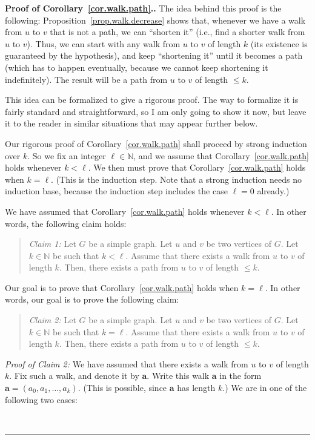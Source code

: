 \documentclass[numbers=enddot,12pt,final,onecolumn,notitlepage]{scrartcl}%
\theoremstyle{definition}
\newenvironment{statement}{\begin{quote}}{\end{quote}}
\newenvironment{proof}[1][Proof]{\noindent\textbf{#1.} }{\ \rule{0.5em}{0.5em}}
\newcommand{\NN}{\mathbb{N}}
\newcommand{\tup}[1]{\left( #1 \right)}
\begin{document}
\begin{proof}[Proof of Corollary~\ref{cor.walk.path}.]
The idea behind this proof is the following:
Proposition~\ref{prop.walk.decrease} shows that, whenever we have a
walk from $u$ to $v$ that is not a path, we can ``shorten it'' (i.e.,
find a shorter walk from $u$ to $v$).
Thus, we can start with any walk from $u$ to $v$ of length $k$ (its
existence is guaranteed by the hypothesis), and keep ``shortening it''
until it becomes a path (which has to happen eventually, because we
cannot keep shortening it indefinitely). The result will be a path
from $u$ to $v$ of length $\leq k$.

This idea can be formalized to give a rigorous proof. The way to
formalize it is fairly standard and straightforward, so I am only
going to show it now, but leave it to the reader in similar situations
that may appear further below.

Our rigorous proof of Corollary~\ref{cor.walk.path} shall proceed by
strong induction over $k$. So we fix an integer $\ell \in \NN$, and
we assume that Corollary~\ref{cor.walk.path} holds whenever
$k < \ell$. We then must prove that Corollary~\ref{cor.walk.path}
holds when $k = \ell$. (This is the induction step. Note that a strong
induction needs no induction base, because the induction step includes
the case $\ell = 0$ already.)

We have assumed that Corollary~\ref{cor.walk.path} holds whenever
$k < \ell$. In other words, the following claim holds:

\begin{statement}
\textit{Claim 1:} Let $G$ be a simple graph. Let $u$ and $v$ be two
vertices of $G$.
Let $k \in \NN$ be such that $k < \ell$.
Assume that there exists a walk from $u$ to $v$ of length $k$.
Then, there exists a path from $u$ to $v$ of length $\leq k$.
\end{statement}

Our goal is to prove that Corollary~\ref{cor.walk.path}
holds when $k = \ell$. In other words, our goal is to prove the
following claim:

\begin{statement}
\textit{Claim 2:} Let $G$ be a simple graph. Let $u$ and $v$ be two
vertices of $G$.
Let $k \in \NN$ be such that $k = \ell$.
Assume that there exists a walk from $u$ to $v$ of length $k$.
Then, there exists a path from $u$ to $v$ of length $\leq k$.
\end{statement}

\textit{Proof of Claim 2:} We have assumed that there exists a walk
from $u$ to $v$ of length $k$. Fix such a walk, and denote it by
$\mathbf{a}$. Write this walk $\mathbf{a}$ in the form
$\mathbf{a} = \tup{a_0, a_1, \ldots, a_k}$. (This is possible, since
$\mathbf{a}$ has length $k$.) We are in one of the following two
cases:


\end{proof}
\end{document}

